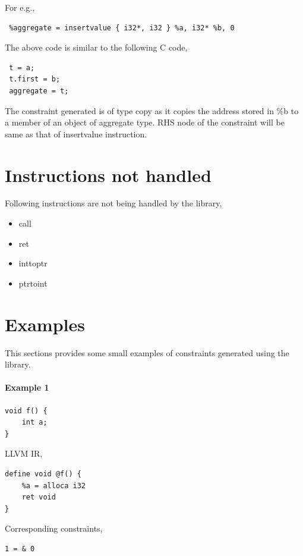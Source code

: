 \documentclass[a4paper,12pt]{report}
\begin{document}
For e.g.,

\begin{lstlisting}
 %aggregate = insertvalue { i32*, i32 } %a, i32* %b, 0
\end{lstlisting}

The above code is similar to the following C code,

\begin{lstlisting}
 t = a;
 t.first = b;
 aggregate = t;
\end{lstlisting}

The constraint generated is of type copy as it copies the address stored in \%b 
to a member of an object of aggregate type. RHS node of the constraint will be 
same as that of insertvalue instruction.

\section{Instructions not handled}
Following instructions are not being handled by the library,

\begin{itemize}
    \item call
    \item ret
    \item inttoptr
    \item ptrtoint
\end{itemize}

\section{Examples}
This sections provides some small examples of constraints generated using the
library.

\paragraph{Example 1}

\begin{verbatim}
void f() {
    int a;
}
\end{verbatim}

\noindent
LLVM IR,
\begin{verbatim}
define void @f() {
    %a = alloca i32
    ret void
}
\end{verbatim}

Corresponding constraints,
\begin{lstlisting}
1 = & 0
\end{lstlisting}
\end{document}
